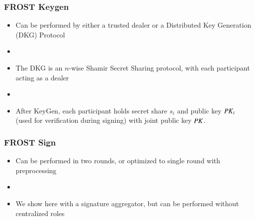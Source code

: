 \documentclass[hyperref={pdfpagelabels=true},table,dvipsnames,14pt,aspectratio=169]{beamer}
\begin{document}
\begin{frame}
  \frametitle{FROST Keygen}

  \begin{itemize}
    \item<1-> Can be performed by either a trusted dealer or a Distributed Key
      Generation (DKG) Protocol
    \item[]
    \item<2-> The DKG is an $n$-wise Shamir Secret Sharing protocol, with each
      participant acting as a dealer
    \item[]
    \item<3> After KeyGen, each participant holds secret share $s_i$ and
      public key $\mathit{PK}_i$ (used for verification during signing) with joint public key $\mathit{PK}$.
  \end{itemize}

\end{frame}

\begin{frame}
  \frametitle{FROST Sign}

  \begin{itemize}
    \item<1-> Can be performed in two rounds, or optimized to single round with
      preprocessing
    \item[]
    \item<2-> We show here with a signature aggregator, but can be
      performed without centralized roles
  \end{itemize}
\end{frame}
\end{document}
